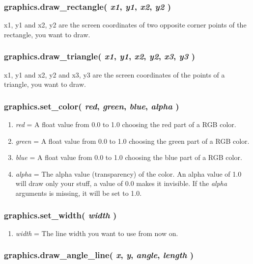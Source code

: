 \documentclass[11pt,parskip=half,a4paper]{scrartcl}
\begin{document}
\subsubsection{graphics.draw\_rectangle( \emph{x1}, \emph{y1}, \emph{x2}, \emph{y2} )}

x1, y1 and x2, y2 are the screen coordinates of two opposite corner points of the rectangle, you want to draw.

\subsubsection{graphics.draw\_triangle( \emph{x1}, \emph{y1}, \emph{x2}, \emph{y2}, \emph{x3}, \emph{y3} )}

x1, y1 and x2, y2 and x3, y3 are the screen coordinates of the points of a triangle, you want to draw.

\subsubsection{graphics.set\_color( \emph{red}, \emph{green}, \emph{blue}, \emph{alpha} )}

\begin{enumerate}
	\item \emph{red} = A float value from 0.0 to 1.0 choosing the red part of a RGB color.
	\item \emph{green} = A float value from 0.0 to 1.0 choosing the green part of a RGB color.
	\item \emph{blue} = A float value from 0.0 to 1.0 choosing the blue part of a RGB color.
	\item \emph{alpha} = The alpha value (transparency) of the color. An alpha value of 1.0 will draw only your stuff, a value of 0.0 makes it invisible. If the \emph{alpha} arguments is missing, it will be set to 1.0.
\end{enumerate}

\subsubsection{graphics.set\_width( \emph{width} )}

\begin{enumerate}
	\item \emph{width} = The line width you want to use from now on.
\end{enumerate}

\subsubsection{graphics.draw\_angle\_line( \emph{x}, \emph{y}, \emph{angle}, \emph{length} )}
\end{document}
